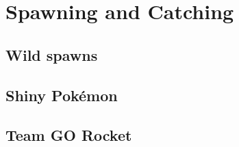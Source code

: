 \chapter{Spawning and Catching}
\label{chap:spawn}

\section{Wild spawns}
\label{section:spawns}

\section{Shiny Pokémon}
\label{section:shiny}

\section{Team GO Rocket}
\label{section:rocket}
